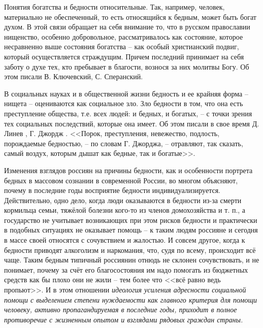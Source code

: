Понятия богатства и бедности относительные. Так, например, человек, 
материально не обеспеченный, то есть относящийся к бедным, может быть богат 
духом. В этой связи обращает на себя внимание то, что в русском православии 
нищенство, особенно добровольное, рассматривалось как состояние, которое 
несравненно выше состояния богатства -- как особый христианский подвиг, 
который осуществляется страждущим. Причем последний принимает на себя заботу о 
духе тех, кто пребывает в благости, вознося за них молитвы Богу. Об этом 
писали В. Ключевский, С. Сперанский\cite{volch_s4}.

В социальных науках и в общественной жизни бедность и ее крайняя форма -- 
нищета -- оцениваются как социальное зло. Зло бедности в том, что она есть 
преступление общества, т.е. всех людей: и бедных, и богатых, -- с точки зрения 
тех социальных последствий, которые она имеет. Об этом писали в свое время 
Д. Линев \cite{volch_s5}, Г. Джордж \cite{volch_s6}. <<Порок, преступления, 
невежество, подлость, порождаемые бедностью, -- по словам Г. Джорджа, -- 
отравляют, так сказать, самый воздух, которым дышат как бедные, так и 
богатые>>.

Изменения взглядов россиян на причины бедности, как и особенности портрета 
бедных в массовом сознании в современной России, во многом объясняют, почему 
в последние годы восприятие бедности индивидуализируется. Действительно, одно 
дело, когда люди оказываются в бедности из-за смерти кормильца семьи, тяжёлой 
болезни кого-то из членов домохозяйства и т. п., а государство не учитывает 
возникающих при этом рисков бедности и практически в подобных ситуациях не 
оказывает помощь -- к таким людям россияне и сегодня в массе своей относятся 
с сочувствием и жалостью. И совсем другое, когда к бедности приводят 
алкоголизм и наркомания, что, судя по всему, происходит всё чаще. Таким бедным 
типичный россиянин отнюдь не склонен сочувствовать, и не понимает, почему за 
счёт его благосостояния им надо помогать из бюджетных средств как бы плохо 
они не жили -- тем более что <<всё равно ведь пропьют>>. И в этом отношении 
\emph{идеология усиления адресности социальной помощи с выделением степени 
нуждаемости как главного критерия для помощи человеку, активно 
пропагандируемая в последние годы, приходит в полное противоречие с жизненным 
опытом и взглядами рядовых граждан страны.}

